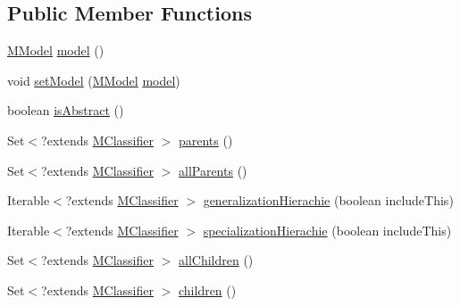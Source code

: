 \subsection*{Public Member Functions}
\begin{DoxyCompactItemize}
\item 
\hyperlink{classorg_1_1tzi_1_1use_1_1uml_1_1mm_1_1_m_model}{M\-Model} \hyperlink{interfaceorg_1_1tzi_1_1use_1_1uml_1_1mm_1_1_m_classifier_a34f38310d790d7b565c396c2dcec38b8}{model} ()
\item 
void \hyperlink{interfaceorg_1_1tzi_1_1use_1_1uml_1_1mm_1_1_m_classifier_a59b275b87f8fe390b8c37b3aedc70396}{set\-Model} (\hyperlink{classorg_1_1tzi_1_1use_1_1uml_1_1mm_1_1_m_model}{M\-Model} \hyperlink{interfaceorg_1_1tzi_1_1use_1_1uml_1_1mm_1_1_m_classifier_a34f38310d790d7b565c396c2dcec38b8}{model})
\item 
boolean \hyperlink{interfaceorg_1_1tzi_1_1use_1_1uml_1_1mm_1_1_m_classifier_a215a6b06940b04f0a90f0289e07b72f1}{is\-Abstract} ()
\item 
Set$<$?extends \hyperlink{interfaceorg_1_1tzi_1_1use_1_1uml_1_1mm_1_1_m_classifier}{M\-Classifier} $>$ \hyperlink{interfaceorg_1_1tzi_1_1use_1_1uml_1_1mm_1_1_m_classifier_a2dd6bc95807327c6f84630081e4a11a6}{parents} ()
\item 
Set$<$?extends \hyperlink{interfaceorg_1_1tzi_1_1use_1_1uml_1_1mm_1_1_m_classifier}{M\-Classifier} $>$ \hyperlink{interfaceorg_1_1tzi_1_1use_1_1uml_1_1mm_1_1_m_classifier_a7c17beba90e9c68271af8d25de7c50fc}{all\-Parents} ()
\item 
Iterable$<$?extends \hyperlink{interfaceorg_1_1tzi_1_1use_1_1uml_1_1mm_1_1_m_classifier}{M\-Classifier} $>$ \hyperlink{interfaceorg_1_1tzi_1_1use_1_1uml_1_1mm_1_1_m_classifier_a5184fd530dcfba32c8cca07bc327b04f}{generalization\-Hierachie} (boolean include\-This)
\item 
Iterable$<$?extends \hyperlink{interfaceorg_1_1tzi_1_1use_1_1uml_1_1mm_1_1_m_classifier}{M\-Classifier} $>$ \hyperlink{interfaceorg_1_1tzi_1_1use_1_1uml_1_1mm_1_1_m_classifier_abdf1bae3e55d8f38f14710d21b4c9fb7}{specialization\-Hierachie} (boolean include\-This)
\item 
Set$<$?extends \hyperlink{interfaceorg_1_1tzi_1_1use_1_1uml_1_1mm_1_1_m_classifier}{M\-Classifier} $>$ \hyperlink{interfaceorg_1_1tzi_1_1use_1_1uml_1_1mm_1_1_m_classifier_a9d03eefaaa3676e27d1aa025dea41884}{all\-Children} ()
\item 
Set$<$?extends \hyperlink{interfaceorg_1_1tzi_1_1use_1_1uml_1_1mm_1_1_m_classifier}{M\-Classifier} $>$ \hyperlink{interfaceorg_1_1tzi_1_1use_1_1uml_1_1mm_1_1_m_classifier_a0bc9d1d796999fa337ce4bf6395c313d}{children} ()

\end{DoxyCompactItemize}

